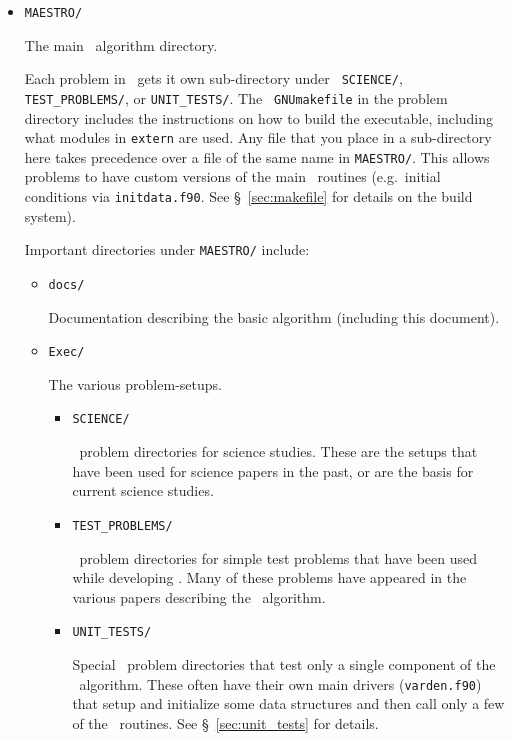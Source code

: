 \begin{itemize}

\item {\tt MAESTRO/}

  The main \maestro\ algorithm directory.  

  Each problem in \maestro\ gets it own sub-directory under {\tt
    SCIENCE/}, {\tt TEST\_PROBLEMS/}, or {\tt UNIT\_TESTS/}.  The {\tt
    GNUmakefile} in the problem directory includes the instructions on
  how to build the executable, including what modules in {\tt extern}
  are used.  Any file that you place in a sub-directory here takes
  precedence over a file of the same name in {\tt MAESTRO/}.  This
  allows problems to have custom versions of the main
  \maestro\ routines (e.g.\ initial conditions via {\tt initdata.f90}.
  See \S~\ref{sec:makefile} for details on the build system).

  Important directories under {\tt MAESTRO/} include:

  \begin{itemize}

  \item {\tt docs/}

    Documentation describing the basic algorithm (including this
    document).

  \item {\tt Exec/}

    The various problem-setups.
 
    \begin{itemize}
    \item {\tt SCIENCE/}

      \maestro\ problem directories for science studies.  These are
      the setups that have been used for science papers in the past,
      or are the basis for current science studies.

    \item {\tt TEST\_PROBLEMS/}
 
      \maestro\ problem directories for simple test problems that have
      been used while developing \maestro.  Many of these problems
      have appeared in the various papers describing the
      \maestro\ algorithm.

    \item {\tt UNIT\_TESTS/}

      Special \maestro\ problem directories that test only a single
      component of the \maestro\ algorithm.  These often have their
      own main drivers ({\tt varden.f90}) that setup and initialize
      some data structures and then call only a few of the
      \maestro\ routines.  See \S~\ref{sec:unit_tests} for details.


\end{itemize}
\end{itemize}
\end{itemize}
